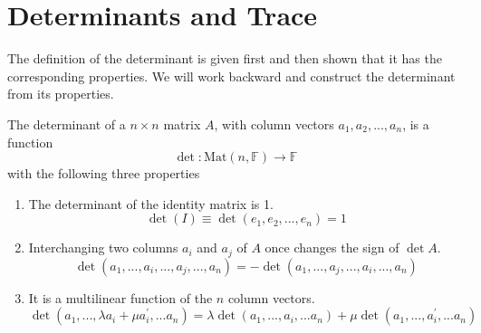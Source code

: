 \section{Determinants and Trace}

  The definition of the determinant is given first and then shown that it has the corresponding properties. We will work backward and construct the determinant from its properties. 

  \begin{definition}[Determinant]
    The determinant of a $n \times n$ matrix $A$, with column vectors $a_1, a_2, ..., a_n$, is a function
    \begin{equation}
      \det: \text{Mat}(n, \mathbb{F}) \longrightarrow \mathbb{F}
    \end{equation}
    with the following three properties
    \begin{enumerate}
      \item The determinant of the identity matrix is 1. 
      \begin{equation}
        \det{(I)} \equiv \det{(e_1, e_2, ..., e_n)} = 1
      \end{equation}
      \item Interchanging two columns $a_i$ and $a_j$ of $A$ once changes the sign of $\det{A}$. 
      \begin{equation}
        \det{(a_1, ..., a_i, ..., a_j, ..., a_n)} = -\det{(a_1, ..., a_j, ..., a_i, ..., a_n)}
      \end{equation}
      \item It is a multilinear function of the $n$ column vectors. 
      \begin{equation}
        \det{(a_1, ..., \lambda a_i + \mu a_i^\prime, ... a_n)} = \lambda \det{(a_1, ..., a_i, ... a_n)} + \mu \det{(a_1, ..., a_i^\prime, ... a_n)}
      \end{equation}
    \end{enumerate}
  \end{definition}

